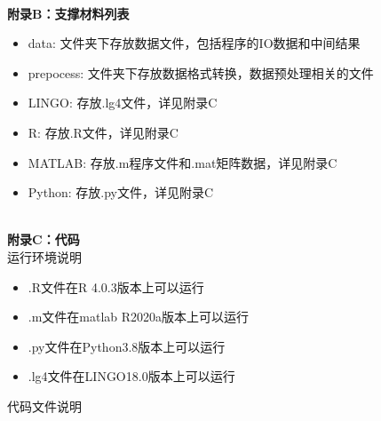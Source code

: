 \documentclass{my_paper}
\begin{document}
\hspace*{\fill} \\ 
\noindent \textbf{附录B：支撑材料列表} \\

\begin{itemize}

\item data: 文件夹下存放数据文件，包括程序的IO数据和中间结果
\item prepocess: 文件夹下存放数据格式转换，数据预处理相关的文件
\item LINGO: 存放.lg4文件，详见附录C
\item R: 存放.R文件，详见附录C
\item MATLAB: 存放.m程序文件和.mat矩阵数据，详见附录C
\item Python: 存放.py文件，详见附录C
\end{itemize}

\hspace*{\fill} \\ 

\noindent \textbf{附录C：代码} \\

运行环境说明

\begin{itemize}
\item .R文件在R 4.0.3版本上可以运行
\item .m文件在matlab R2020a版本上可以运行
\item .py文件在Python3.8版本上可以运行
\item .lg4文件在LINGO18.0版本上可以运行
\end{itemize}

代码文件说明
\end{document}
